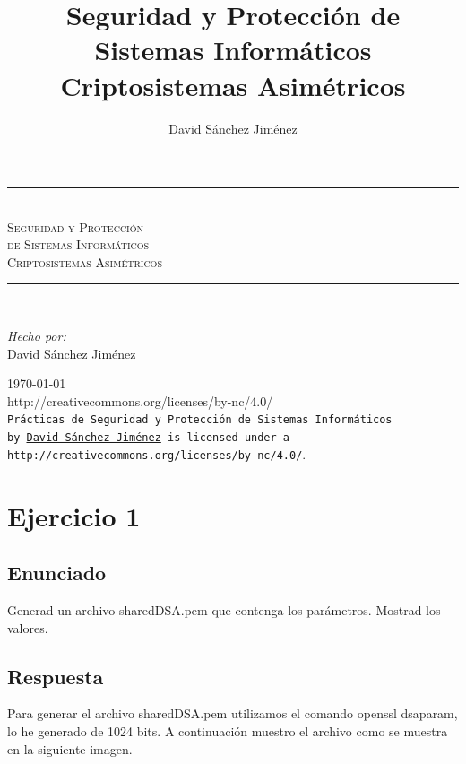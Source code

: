 \documentclass[10pt,a4paper,spanish]{report}
\title{Seguridad y Protección de Sistemas Informáticos \\
Criptosistemas Asimétricos}
\author{David Sánchez Jiménez}
\newcommand{\HRule}{\rule{\linewidth}{0.5mm}} %
\begin{document}
\begin{titlepage}
 \begin{center}
  \HRule \\[0.8cm]
  \textsc{\huge Seguridad y Protección \\ de Sistemas Informáticos \\[0.5cm] Criptosistemas Asimétricos}\\[1.6cm]
  \HRule \\[1cm]
  \begin{flushleft}
   \emph{Hecho por:}\\
   David Sánchez Jiménez
  \end{flushleft}
  \vspace{12cm}
  \large{\today}\\
  \vspace{0.5cm}
  {http://creativecommons.org/licenses/by-nc/4.0/}\\[0.5cm]
  \texttt{Prácticas de Seguridad y Protección de Sistemas Informáticos\\ by
   \href{mailto:dasaji92@gmail.com}{David Sánchez Jiménez} is licensed under a 
   {http://creativecommons.org/licenses/by-nc/4.0/}}.\\[3mm]
 \end{center}
\end{titlepage}

\tableofcontents
\newpage

\chapter{Ejercicio 1}

\section{Enunciado}
\noindent
Generad un archivo sharedDSA.pem que contenga los parámetros. Mostrad los valores.

\section{Respuesta}
\noindent
Para generar el archivo sharedDSA.pem utilizamos el comando openssl dsaparam, lo he generado de 1024 bits. A continuación muestro el archivo como se muestra en la siguiente imagen.
\end{document}
